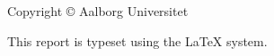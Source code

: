 \thispagestyle{empty}
{\small
\strut\vfill %
\noindent Copyright \copyright{} Aalborg Universitet \the\year{}\par
\vspace{0.2cm}
\noindent This report is typeset using the \LaTeX{} system.
}
\clearpage
